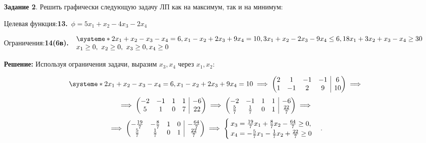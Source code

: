 \documentclass[11pt]{article}
\makeatletter
\newenvironment{amatrix}[1]{%
  \left(\begin{array}{@{}*{#1}{c}|c@{}}
}{%
  \end{array}\right)
}
\makeatother
\begin{document}
\textbf{Задание 2}. Решить графически следующую задачу ЛП как на максимум, так и на минимум:

Целевая функция:\quad  \textbf{13.}\  $\phi = 5x_1 + x_2 - 4x_3 - 2x_4$

Ограничения:\quad \textbf{14(6в).}\  $
\begin{array}{l}
\systeme*{  
2x_1 + x_2 - x_3  -x_4 = 6, 
x_1 - x_2 + 2x_3 + 9x_4 = 10, 
3x_1 + x_2 - 2x_3  - 9x_4 \leq 6,
18x_1 + 3x_2 +x_3  - x_4 \geq 30}\\
x_1 \geq 0,\ x_2 \geq 0, \ x_3 \geq 0, x_4 \geq 0
\end{array}
$


 \hfill

\textbf{Решение: } Используя ограничения задачи,
выразим $x_3, x_4$ через $x_1, x_2$:

\begin{equation*}
\systeme*{  
2x_1 + x_2 - x_3  -x_4 = 6, 
x_1 - x_2 + 2x_3 + 9x_4 = 10} \implies \begin{amatrix}{4}
   2 & 1 & -1 & -1 & 6\\  1 & -1 & 2 & 9 & 10
 \end{amatrix}  \implies
\end{equation*}
\begin{equation*}
\implies
\begin{amatrix}{4}
   -2 & -1 & 1 & 1 & -6\\  5 & 1 & 0 & 7 & 22
 \end{amatrix}  
\implies
\begin{amatrix}{4}
   -2 & -1 & 1 & 1 & -6\\  \frac57 & \frac17 & 0 & 1 & \frac{22}7
 \end{amatrix}  \implies
\end{equation*}
\begin{equation*}
\implies
\begin{amatrix}{4}
   -\frac{19}7 & -\frac87 & 1 & 0 & -\frac{64}7\\  \frac57 & \frac17 & 0 & 1 & \frac{22}7
 \end{amatrix}  
 \implies
 \begin{cases}
x_3 =  \frac{19}7x_1  + \frac87x_2  -\frac{64}7  \geq 0,\\ 
x_4 = -\frac57x_1 - \frac17x_2 +  \frac{22}7 \geq 0
\end{cases}.
\end{equation*}
\end{document}
